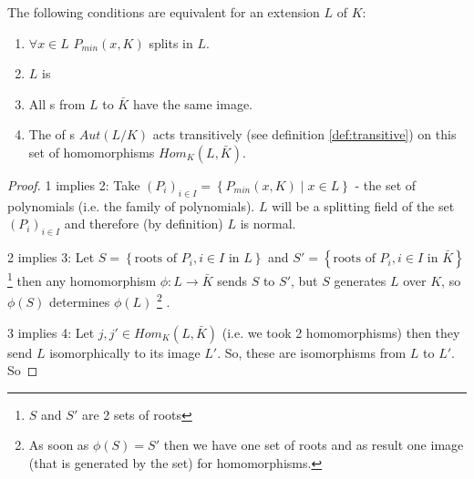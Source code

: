 \begin{theorem}
  The following conditions are equivalent for an extension $L$ of $K$:
  \begin{enumerate}
  \item $\forall x \in L$ $P_{min}\left(x, K\right)$ splits in $L$.
  \item $L$ is 
  \item All s from $L$ to $\bar{K}$ have the
    same image.
  \item The  of s
    $Aut\left(L/K\right)$ acts transitively (see definition
    \ref{def:transitive}) on this set of 
    homomorphisms $Hom_K\left(L, \bar{K}\right)$.
  \end{enumerate}
  \begin{proof}
    1 implies 2: Take
    $\left(P_i\right)_{i \in I} = \left\{P_{min}\left(x, K\right) \mid
    x \in L\right\}$ - the set of polynomials
    (i.e. the family of polynomials).
    $L$ will be a splitting field of the set $\left(P_i\right)_{i \in
      I}$ and therefore (by definition) $L$ is normal.

    2 implies 3: Let
    $S = \left\{\mbox{roots of } P_i, i \in I \mbox{ in } L\right\}$
    and
    $S' = \left\{\mbox{roots of } P_i, i \in I \mbox{ in }
    \bar{K}\right\}$
    \footnote{
      $S$ and $S'$ are 2 sets of roots
    }
    then any homomorphism
    $\phi: L \to \bar{K}$ sends $S$ to $S'$, but $S$ generates $L$
    over $K$, so $\phi\left(S\right)$ determines $\phi\left(L\right)$
    \footnote{
      As soon as $\phi(S) = S'$ then we have one set of roots and as
      result one image (that is generated by the set) for homomorphisms.
    }
    .

    3 implies 4: Let $j, j' \in Hom_K\left(L, \bar{K}\right)$
    (i.e. we took 2 homomorphisms)
    then
    they send $L$ isomorphically to its image $L'$. So, these are
    isomorphisms from $L$ to $L'$. So

    

\end{proof}
\end{theorem}
